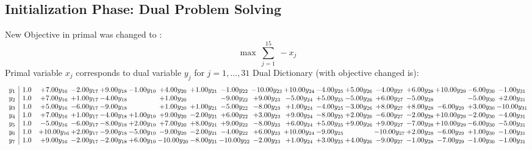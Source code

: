 \documentclass[9pt]{article}
\begin{document}
\subsection{Initialization Phase: Dual Problem Solving}
New Objective in primal was changed to : \[ \max\ \sum_{j=1}^{15}\ - x_j \] 
Primal variable $x_j$ corresponds to dual variable $y_j$ for $j = 1,\ldots,31$
Dual Dictionary (with objective changed is): 
\[\begin{array}{c| c c@{\hskip 2pt} c@{\hskip 2pt} c@{\hskip 2pt} c@{\hskip 2pt} c@{\hskip 2pt} c@{\hskip 2pt} c@{\hskip 2pt} c@{\hskip 2pt} c@{\hskip 2pt} c@{\hskip 2pt} c@{\hskip 2pt} c@{\hskip 2pt} c@{\hskip 2pt} c@{\hskip 2pt} c@{\hskip 2pt} c@{\hskip 2pt} }
 y_{1}   &  1.0 & +  7.00 y_{16} & -2.00 y_{17} & +  9.00 y_{18} & -1.00 y_{19} & +  4.00 y_{20} & +  1.00 y_{21} & -1.00 y_{22} & -10.00 y_{23} & + 10.00 y_{24} & -4.00 y_{25} & +  5.00 y_{26} & -4.00 y_{27} & +  6.00 y_{28} & + 10.00 y_{29} & -6.00 y_{30} & -1.00 y_{31}\\
 y_{2}   &  1.0 & +  7.00 y_{16} & +  1.00 y_{17} & -4.00 y_{18} &   & +  1.00 y_{20} &   & -9.00 y_{22} & +  9.00 y_{23} & -5.00 y_{24} & +  5.00 y_{25} & -5.00 y_{26} & +  6.00 y_{27} & -5.00 y_{28} &   & -5.00 y_{30} & +  2.00 y_{31}\\
 y_{3}   &  1.0 & +  5.00 y_{16} & -6.00 y_{17} & -9.00 y_{18} &   & +  1.00 y_{20} & +  1.00 y_{21} & -5.00 y_{22} & -8.00 y_{23} & +  1.00 y_{24} & -4.00 y_{25} & -3.00 y_{26} & +  8.00 y_{27} & +  8.00 y_{28} & -6.00 y_{29} & +  3.00 y_{30} & -10.00 y_{31}\\
 y_{4}   &  1.0 & +  7.00 y_{16} & +  1.00 y_{17} & -4.00 y_{18} & +  1.00 y_{19} & +  9.00 y_{20} & -2.00 y_{21} & +  6.00 y_{22} & +  3.00 y_{23} & +  9.00 y_{24} & -8.00 y_{25} & +  2.00 y_{26} & -6.00 y_{27} & -2.00 y_{28} & + 10.00 y_{29} & -2.00 y_{30} & -4.00 y_{31}\\
 y_{5}   &  1.0 & -5.00 y_{16} & -6.00 y_{17} & -8.00 y_{18} & +  2.00 y_{19} & +  7.00 y_{20} & +  8.00 y_{21} & +  9.00 y_{22} & -8.00 y_{23} & +  6.00 y_{24} & +  5.00 y_{25} & +  9.00 y_{26} & +  9.00 y_{27} & -7.00 y_{28} & + 10.00 y_{29} & -6.00 y_{30} & -5.00 y_{31}\\
 y_{6}   &  1.0 & + 10.00 y_{16} & +  2.00 y_{17} & -9.00 y_{18} & -5.00 y_{19} & -9.00 y_{20} & -2.00 y_{21} & -4.00 y_{22} & +  6.00 y_{23} & + 10.00 y_{24} & -9.00 y_{25} &   & -10.00 y_{27} & +  2.00 y_{28} & -6.00 y_{29} & +  1.00 y_{30} & -1.00 y_{31}\\
 y_{7}   &  1.0 & +  9.00 y_{16} & -2.00 y_{17} & -2.00 y_{18} & +  6.00 y_{19} & -10.00 y_{20} & -8.00 y_{21} & -10.00 y_{22} & -2.00 y_{23} & +  1.00 y_{24} & +  3.00 y_{25} & +  4.00 y_{26} & -9.00 y_{27} & -1.00 y_{28} & -7.00 y_{29} & -1.00 y_{30} & -1.00 y_{31}\\

\end{array}\]
\end{document}
